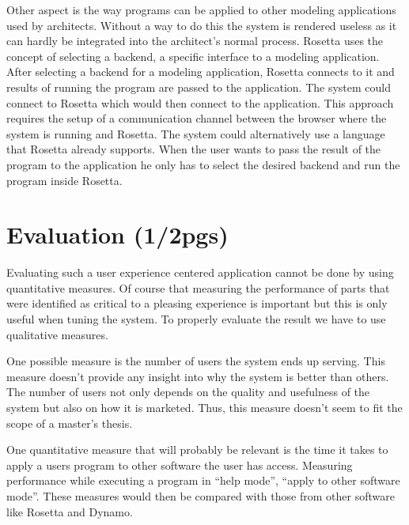 \documentclass{./llncs2e/llncs}
\begin{document}
	Other aspect is the way programs can be applied to other modeling applications used by architects.
	Without a way to do this the system is rendered useless as it can hardly be integrated into the architect's normal process. 
	Rosetta uses the concept of selecting a backend, a specific interface to a modeling application. 
	After selecting a backend for a modeling application, Rosetta connects to it and results of running the program are passed to the application. 
	The system could connect to Rosetta which would then connect to the application. 
	This approach requires the setup of a communication channel between the browser where the system is running and Rosetta. 
	The system could alternatively use a language that Rosetta already supports. 
	When the user wants to pass the result of the program to the application he only has to select the desired backend and run the program inside Rosetta.


\section{Evaluation (1/2pgs)}
	Evaluating such a user experience centered application cannot be done by using quantitative measures.
	Of course that measuring the performance of parts that were identified as critical to a pleasing experience is important but this is only useful when tuning the system. 
	To properly evaluate the result we have to use qualitative measures.

	One possible measure is the number of users the system ends up serving.
	This measure doesn't provide any insight into why the system is better than others. 
	The number of users not only depends on the quality and usefulness of the system but also on how it is marketed. 
	Thus, this measure doesn't seem to fit the scope of a master's thesis.

	One quantitative measure that will probably be relevant is the time it takes to apply a users program to other software the user has access.
	Measuring performance while executing a program in ``help mode'', ``apply to other software mode''. 
	These measures would then be compared with those from other software like Rosetta and Dynamo.
\end{document}
